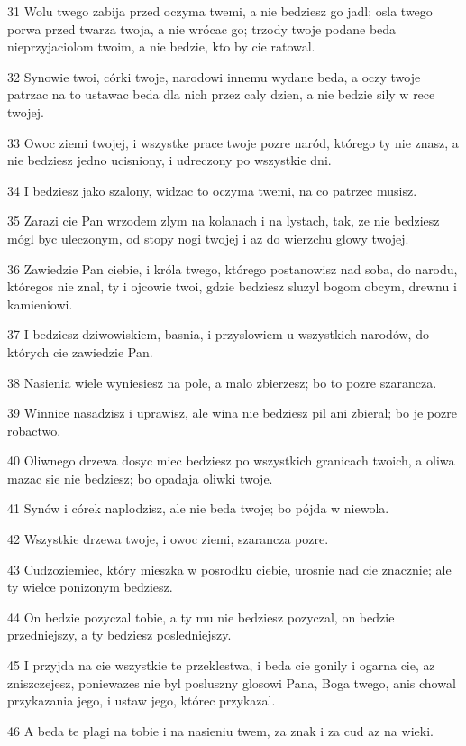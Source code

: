\par 31 Wolu twego zabija przed oczyma twemi, a nie bedziesz go jadl; osla twego porwa przed twarza twoja, a nie wrócac go; trzody twoje podane beda nieprzyjaciolom twoim, a nie bedzie, kto by cie ratowal.
\par 32 Synowie twoi, córki twoje, narodowi innemu wydane beda, a oczy twoje patrzac na to ustawac beda dla nich przez caly dzien, a nie bedzie sily w rece twojej.
\par 33 Owoc ziemi twojej, i wszystke prace twoje pozre naród, którego ty nie znasz, a nie bedziesz jedno ucisniony, i udreczony po wszystkie dni.
\par 34 I bedziesz jako szalony, widzac to oczyma twemi, na co patrzec musisz.
\par 35 Zarazi cie Pan wrzodem zlym na kolanach i na lystach, tak, ze nie bedziesz mógl byc uleczonym, od stopy nogi twojej i az do wierzchu glowy twojej.
\par 36 Zawiedzie Pan ciebie, i króla twego, którego postanowisz nad soba, do narodu, któregos nie znal, ty i ojcowie twoi, gdzie bedziesz sluzyl bogom obcym, drewnu i kamieniowi.
\par 37 I bedziesz dziwowiskiem, basnia, i przyslowiem u wszystkich narodów, do których cie zawiedzie Pan.
\par 38 Nasienia wiele wyniesiesz na pole, a malo zbierzesz; bo to pozre szarancza.
\par 39 Winnice nasadzisz i uprawisz, ale wina nie bedziesz pil ani zbieral; bo je pozre robactwo.
\par 40 Oliwnego drzewa dosyc miec bedziesz po wszystkich granicach twoich, a oliwa mazac sie nie bedziesz; bo opadaja oliwki twoje.
\par 41 Synów i córek naplodzisz, ale nie beda twoje; bo pójda w niewola.
\par 42 Wszystkie drzewa twoje, i owoc ziemi, szarancza pozre.
\par 43 Cudzoziemiec, który mieszka w posrodku ciebie, urosnie nad cie znacznie; ale ty wielce ponizonym bedziesz.
\par 44 On bedzie pozyczal tobie, a ty mu nie bedziesz pozyczal, on bedzie przedniejszy, a ty bedziesz posledniejszy.
\par 45 I przyjda na cie wszystkie te przeklestwa, i beda cie gonily i ogarna cie, az zniszczejesz, poniewazes nie byl posluszny glosowi Pana, Boga twego, anis chowal przykazania jego, i ustaw jego, którec przykazal.
\par 46 A beda te plagi na tobie i na nasieniu twem, za znak i za cud az na wieki.
